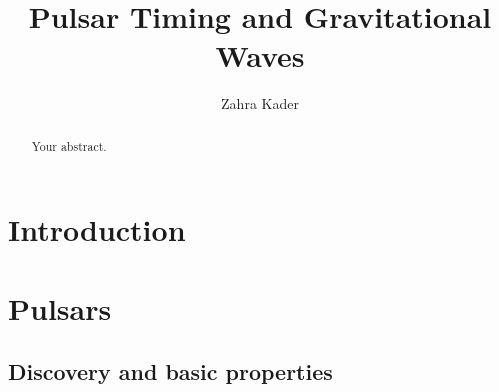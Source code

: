 \documentclass[12pt]{article}
\title{Pulsar Timing and Gravitational Waves}
\author{Zahra Kader}
\begin{document}
	\maketitle

\begin{abstract}
	Your abstract.
\end{abstract}		
	\section{Introduction}
	\section{Pulsars}
	\label{sec:Pulsars}
	
	\subsection{Discovery and basic properties}
	
\end{document}
